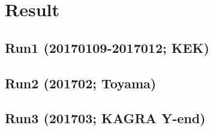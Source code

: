 
\chapter{Result} %

\label{Chapter2} %


\section{Run1 (20170109-2017012; KEK)}

\section{Run2 (201702; Toyama)}

\section{Run3 (201703; KAGRA Y-end)}

